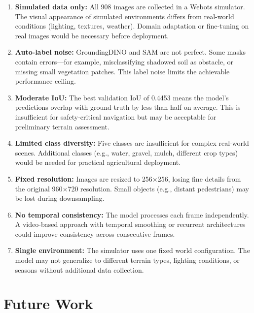\documentclass[12pt,a4paper]{article}
\begin{document}
\begin{enumerate}[noitemsep]
    \item \textbf{Simulated data only:} All 908 images are collected in a Webots simulator. The visual appearance of simulated environments differs from real-world conditions (lighting, textures, weather). Domain adaptation or fine-tuning on real images would be necessary before deployment.

    \item \textbf{Auto-label noise:} GroundingDINO and SAM are not perfect. Some masks contain errors---for example, misclassifying shadowed soil as obstacle, or missing small vegetation patches. This label noise limits the achievable performance ceiling.

    \item \textbf{Moderate IoU:} The best validation IoU of 0.4453 means the model's predictions overlap with ground truth by less than half on average. This is insufficient for safety-critical navigation but may be acceptable for preliminary terrain assessment.

    \item \textbf{Limited class diversity:} Five classes are insufficient for complex real-world scenes. Additional classes (e.g., water, gravel, mulch, different crop types) would be needed for practical agricultural deployment.

    \item \textbf{Fixed resolution:} Images are resized to 256$\times$256, losing fine details from the original 960$\times$720 resolution. Small objects (e.g., distant pedestrians) may be lost during downsampling.

    \item \textbf{No temporal consistency:} The model processes each frame independently. A video-based approach with temporal smoothing or recurrent architectures could improve consistency across consecutive frames.

    \item \textbf{Single environment:} The simulator uses one fixed world configuration. The model may not generalize to different terrain types, lighting conditions, or seasons without additional data collection.
\end{enumerate}

\section{Future Work}
\label{sec:future}
\end{document}

